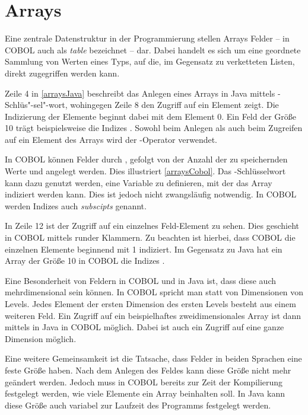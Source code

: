 \section{Arrays}\label{sec:felder}
Eine zentrale Datenstruktur in der Programmierung stellen Arrays \bzw Felder -- in COBOL auch als \textit{table} bezeichnet -- dar. Dabei handelt es sich um eine geordnete Sammlung von Werten eines Typs, auf die, im Gegensatz zu \zB verketteten Listen, direkt zugegriffen werden kann. 

Zeile 4 in \autoref{arraysJava} beschreibt das Anlegen eines Arrays in Java mittels -Schlüs"-sel"-wort, wohingegen Zeile 8 den Zugriff auf ein Element zeigt. Die Indizierung der Elemente beginnt dabei mit dem Element 0. Ein Feld der Größe 10 trägt beispielsweise die Indizes . Sowohl beim Anlegen als auch beim Zugreifen auf ein Element des Arrays wird der \jav{[]}-Operator verwendet.

In COBOL können Felder durch , gefolgt von der Anzahl der zu speichernden Werte und  angelegt werden. Dies illustriert \autoref{arraysCobol}. Das -Schlüsselwort kann dazu genutzt werden, eine Variable zu definieren, mit der das Array indiziert werden kann. Dies ist jedoch nicht zwangsläufig notwendig. In COBOL werden Indizes auch \textit{subscipts} genannt.

In Zeile 12 ist der Zugriff auf ein einzelnes Feld-Element zu sehen. Dies geschieht in COBOL mittels runder Klammern. Zu beachten ist hierbei, dass COBOL die einzelnen Elemente beginnend mit 1 indiziert. Im Gegensatz zu Java hat ein Array der Größe 10 in COBOL die Indizes .

Eine Besonderheit von Feldern in COBOL und in Java ist, dass diese auch mehrdimensional sein können. In COBOL spricht man statt von Dimensionen von Levels. Jedes Element der ersten Dimension \bzw des ersten Levels besteht aus einem weiteren Feld. Ein Zugriff auf ein beispielhaftes zweidimensionales Array ist dann mittels \jav{[][]} in Java \bzw {} in COBOL möglich. Dabei ist auch ein Zugriff auf eine ganze Dimension möglich.

Eine weitere Gemeinsamkeit ist die Tatsache, dass Felder in beiden Sprachen eine feste Größe haben. Nach dem Anlegen des Feldes kann diese Größe nicht mehr geändert werden. Jedoch muss in COBOL bereits zur Zeit der Kompilierung festgelegt werden, wie viele Elemente ein Array beinhalten soll. In Java kann diese Größe auch variabel zur Laufzeit des Programms festgelegt werden.

